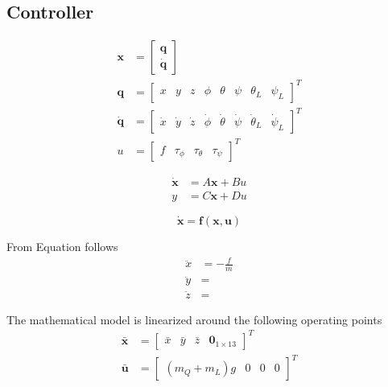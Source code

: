 \documentclass[a4paper,11pt]{mscThesis}
\begin{document}
	    \subsection{Controller}
	    
    
    \begin{align}\label{eq:state}
    \textbf{x}&=\begin{bmatrix}
    \textbf{q}\\
    \mathbf{\dot{q}}
    \end{bmatrix}\\
    \mathbf{q}&=\begin{bmatrix}
    x&y&z&\phi&\theta&\psi&\theta_L&\psi_L
    \end{bmatrix}^T\\
    \mathbf{\dot{q}}&=\begin{bmatrix}
    \dot{x}&\dot{y}&\dot{z}&\dot{\phi}&\dot{\theta}&\dot{\psi}&\dot{\theta}_L&\dot{\psi}_L
    \end{bmatrix}^T\\
    u&=\begin{bmatrix}
    f&\tau_\phi&\tau_\theta&\tau_\psi
    \end{bmatrix}^T
    \end{align}
    
    \begin{align}\label{eq:ss}
    \mathbf{\dot{x} }&=A\mathbf{x}+Bu\\
    y&=C\mathbf{x}+Du
    \end{align}
    
    \begin{equation}\label{key}
    \mathbf{\dot{x}}=\textbf{f}(\mathbf{x,u})
    \end{equation}
    
    From Equation follows
    \begin{align}\label{key}
    \ddot{x}&=-\frac{f}{m}\\
    \ddot{y}&=\\
    \ddot{z}&=
    \end{align}
    
    The mathematical model is linearized around the following operating points
    \begin{align}\label{key}
    \bar{\mathbf{x}}&=\begin{bmatrix}\bar{x}&\bar{y}&\bar{z}&\textbf{0}_{1\times13}\end{bmatrix}^T\\
    \bar{\textbf{u}}&=\begin{bmatrix}
    (m_Q+m_L)g&0&0&0
    \end{bmatrix}^T
    \end{align}
    
\end{document}
